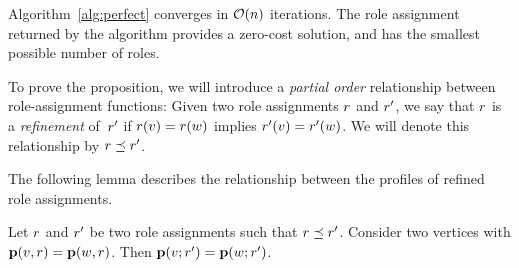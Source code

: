 \iffalse
Note that in the first iteration of \algperfect
the profile of each vertex $v$ is a scalar (1-dimensional vector) 
equal to the degree of the vertex.
Thus, during this first iteration
all vertices with the same degree will be grouped together and will be assigned the same role. 
In subsequent iterations the vertices with the same degree
will be potentially further subdivided to smaller groups, 
and vertices within a group are assigned to the same role. 

As the number of roles can only increase during the execution of \algperfect, 
the previous observation implies that \algperfect 
always returns a solution in which the number of roles $k$ is
at least as large as the number of distinct degrees in the graph. 
To verify this property, 
notice that it is not possible to obtain a perfect role assignment
with a smaller number of roles than the number of distinct degrees. 

Finally, note that the \algperfect algorithm always terminates, 
in the worst case when $k=n$ and each vertex is assigned to a unique role.
\fi


\iffalse
\begin{proposition}
\label{prop:perfectcorrect}
Algorithm~\ref{alg:perfect} converges in $\bigO{n}$ iterations. 
The role assignment returned by the algorithm  
provides a zero-cost solution, 
and has the smallest possible number of roles.
\end{proposition}

To prove the proposition, we will introduce a \emph{partial order} 
relationship between 
role-assignment functions:  
Given two role assignments $r$ and $r'$, we say that $r$ is a
\emph{refinement} of~$r'$ if $r(v) = r(w)$ implies $r'(v) =
r'(w)$. We will denote this relationship by $r \preceq r'$.

The following lemma describes the relationship between the profiles of refined role assignments.

\begin{lemma}
\label{lem:refineprofile}
Let $r$ and $r'$ be two role assignments such that $r \preceq r'$.
Consider two vertices %
with $\prof{v, \role} = \prof{w, \role}$. 
Then $\prof{v; \role'} = \prof{w; \role'}$.
\end{lemma}

